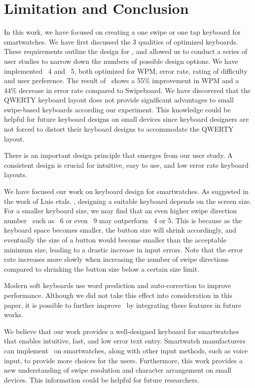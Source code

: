 \section{Limitation and Conclusion}
In this work, we have focused on creating a one swipe or one tap keyboard for smartwatches. We have first discussed the 3 qualities of optimized keyboards. These requirements outline the design for \papertitle, and allowed us to conduct a series of user studies to narrow down the numbers of possible design options. We have implemented \papertitle\ 4 and \papertitle\ 5, both optimized for WPM, error rate, rating of difficulty and user preference. The result of \papertitle\ shows a 55\% improvement in WPM and a 44\% decrease in error rate compared to Swipeboard. We have discovered that the QWERTY keyboard layout does not provide significant advantages to small swipe-based keyboards according our experiment. This knowledge could be helpful for future keyboard designs on small devices since keyboard designers are not forced to distort their keyboard designs to accommodate the QWERTY layout.

There is an important design principle that emerges from our user study. A consistent design is crucial for intuitive, easy to use, and low error rate keyboard layouts.

We have focused our work on keyboard design for smartwatches. As suggested in the work of Luis etals. \cite{text-entry-on-small-qwerty}, designing a suitable keyboard depends on the screen size. For a smaller keyboard size, we may find that an even higher swipe direction number \papertitle\ such as \papertitle\ 6 or even \papertitle\ 9 may outperform \papertitle\ 4 or 5. This is because as the keyboard space becomes smaller, the button size will shrink accordingly, and eventually the size of a button would become smaller than the acceptable minimum size, leading to a drastic increase in input errors. Note that the error rate increases more slowly when increasing the number of swipe directions compared to shrinking the button size below a certain size limit.

Modern soft keyboards use word prediction and auto-correction to improve performance. Although we did not take this effect into consideration in this paper, it is possible to further improve \papertitle\ by integrating these features in future works.

We believe that our work provides a well-designed keyboard for smartwatches that enables intuitive, fast, and low error text entry. Smartwatch manufacturers can implement \papertitle\ on smartwatches, along with other input methods, such as voice input, to provide more choices for the users. Furthermore, this work provides a new understanding of swipe resolution and character arrangement on small devices. This information could be helpful for future researchers.
